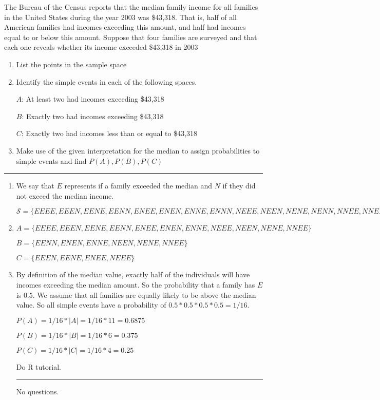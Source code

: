 \documentclass[11pt]{article}
\begin{document}
 
The Bureau of the Census reports that the median family income for all families in the United
States during the year 2003 was \$43,318. That is, half of all American families had incomes
exceeding this amount, and half had incomes equal to or below this amount. Suppose that four
families are surveyed and that each one reveals whether its income exceeded \$43,318 in 2003
\begin{enumerate}[\textbf{a}]
 	\item List the points in the sample space
 	\item Identify the simple events in each of the following spaces.
 	
 	
		\quad $A$: \quad At least two had incomes exceeding \$43,318 	
 	
 		\quad $B$: \quad Exactly two had incomes exceeding \$43,318
 	
 		\quad $C$: \quad Exactly two had incomes less than or equal to \$43,318
 	
 	\item Make use of the given interpretation for the median to assign probabilities to simple events and find $P(A), P(B), P(C)$  
\end{enumerate}
\hrule

\begin{enumerate}[a]

	\item We say that $E$ represents if a family exceeded the median and $N$ if they did not exceed the median income. 
	
	$\mathcal{S} = \{EEEE, EEEN, EENE, EENN, ENEE, ENEN, ENNE, ENNN, NEEE, NEEN, NENE, NENN, NNEE, NNEN, NNNE, NNNN\}$
	
	
	\item
	
	\quad $A = \{EEEE, EEEN, EENE, EENN, ENEE, ENEN, ENNE, NEEE, NEEN, NENE, NNEE\}$
	
	\quad $B = \{EENN, ENEN, ENNE, NEEN, NENE, NNEE\}$
	
	\quad $C = \{EEEN, EENE, ENEE, NEEE\}$
	
	
	\item By definition of the median value, exactly half of the individuals will have incomes exceeding the median amount. So the probability that a family has $E$ is $0.5$. We assume that all families are equally likely to be above the median value. So all simple events have a probability of $0.5 * 0.5 *0.5 * 0.5 = 1/16$.
	
	$P(A) = 1/16 * |A| = 1/16 * 11 = 0.6875$ 
	
	$P(B) = 1/16 * |B| = 1/16 * 6 = 0.375$ 
	
	$P(C) = 1/16 * |C| = 1/16 * 4 = 0.25$ 
	
	 Do R tutorial.
	\hrule
	No questions.

\end{enumerate}
\end{document}
